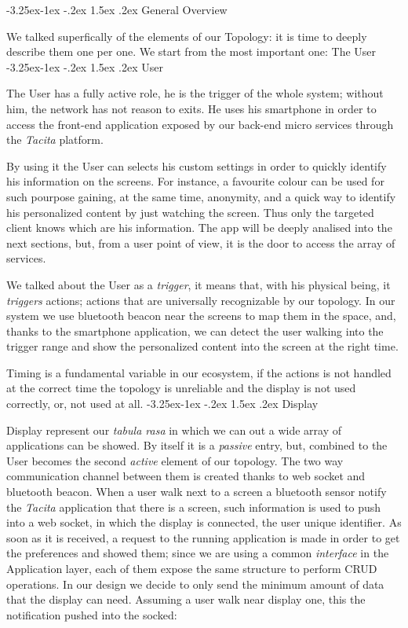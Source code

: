 \documentclass[]{usiinfbachelorproject}
\makeatletter
\newcommand\subsubsection{\@startsection{subsubsection}{3}{\z@}%
                {-3.25ex\@plus -1ex \@minus -.2ex}%
                {1.5ex \@plus .2ex}%
                {\normalfont\normalsize\bfseries}}
\makeatother
\begin{document}
\subsubsection{General Overview}

We talked superfically of the elements of our Topology: it is time to deeply describe them one per one. We start from the most important one: The User  
\subsubsection{User}

The User has a fully active role, he is the trigger of the whole system; without him, the network has not reason to exits. He uses his smartphone in order to access the front-end application exposed by our back-end micro services through the \emph{Tacita} platform.

By using it the User can selects his custom settings in order to quickly identify his information on the screens. For instance, a favourite colour can be used for such pourpose gaining, at the same time, anonymity, and a quick way to identify his personalized content by just watching the screen. Thus only the targeted client knows which are his information. The app will be deeply analised into the next sections, but, from a user point of view, it is the door to access the array of services.

We talked about the User as a \emph{trigger}, it means that, with his physical being, it \emph{triggers} actions; actions that are universally recognizable by our topology. In our system we use bluetooth beacon near the screens to map them in the space, and, thanks to the smartphone application, we can detect the user walking into the trigger range and show the personalized content into the screen at the right time. 

Timing is a fundamental variable in our ecosystem, if the actions is not handled at the correct time the topology is unreliable and the display is not used correctly, or, not used at all. 
\subsubsection{Display}

Display represent our \emph{tabula rasa} in which we can out a wide array of applications can be showed. By itself it is a \emph{passive} entry, but, combined to the User becomes the second \emph{active} element of our topology. The two way communication channel between them is created thanks to web socket and bluetooth beacon. When a user walk next to a screen a bluetooth sensor notify the \emph{Tacita} application that there is a screen, such information is used to push into a web socket, in which the display is connected, the user unique identifier. As soon as it is received, a request to the running application is made in order to get the preferences and showed them; since we are using a common \emph{interface} in the Application layer, each of them expose the same structure to perform CRUD operations.
In our design we decide to only send the minimum amount of data that the display can need. Assuming a user walk near display one, this the notification pushed into the socked:
\end{document}
